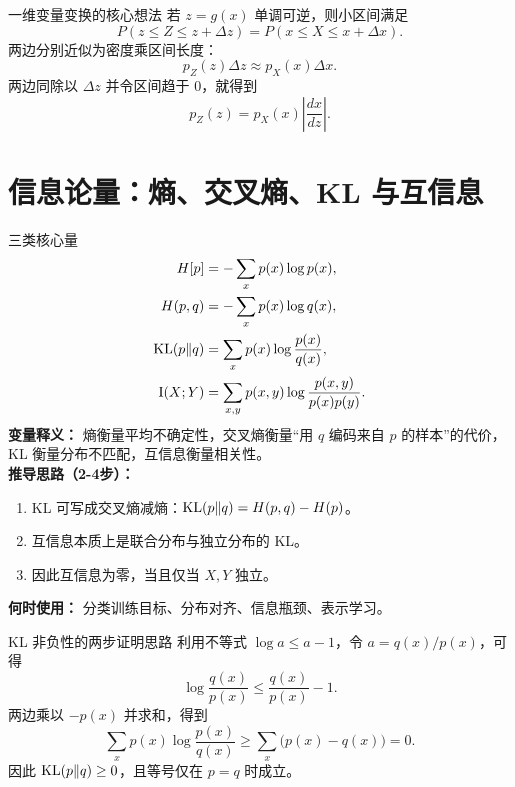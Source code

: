 \documentclass[11pt]{article}
\begin{document}
\begin{derivationbox}{一维变量变换的核心想法}
若 $z=g(x)$ 单调可逆，则小区间满足
\[
P(z\le Z\le z+\Delta z)=P(x\le X\le x+\Delta x).
\]
两边分别近似为密度乘区间长度：
\[
p_Z(z)\Delta z \approx p_X(x)\Delta x.
\]
两边同除以 $\Delta z$ 并令区间趋于 $0$，就得到
\[
p_Z(z)=p_X(x)\left|\frac{dx}{dz}\right|.
\]
\end{derivationbox}

\section{信息论量：熵、交叉熵、KL 与互信息}
\begin{formulabox}{三类核心量}
\begin{align}
H[p] &= -\sum_x p(x)\log p(x),\\
H(p,q) &= -\sum_x p(x)\log q(x),\\
\mathrm{KL}(p\|q) &= \sum_x p(x)\log\frac{p(x)}{q(x)},\\
\mathrm{I}(X;Y) &= \sum_{x,y}p(x,y)\log\frac{p(x,y)}{p(x)p(y)}.
\end{align}
\textbf{变量释义：} 熵衡量平均不确定性，交叉熵衡量“用 $q$ 编码来自 $p$ 的样本”的代价，KL 衡量分布不匹配，互信息衡量相关性。\\
\textbf{推导思路（2-4步）：}
\begin{enumerate}[leftmargin=1.6em]
  \item KL 可写成交叉熵减熵：$\mathrm{KL}(p\|q)=H(p,q)-H(p)$。
  \item 互信息本质上是联合分布与独立分布的 KL。
  \item 因此互信息为零，当且仅当 $X,Y$ 独立。
\end{enumerate}
\textbf{何时使用：} 分类训练目标、分布对齐、信息瓶颈、表示学习。
\end{formulabox}

\begin{derivationbox}{KL 非负性的两步证明思路}
利用不等式 $\log a \le a-1$，令 $a=q(x)/p(x)$，可得
\[
\log\frac{q(x)}{p(x)} \le \frac{q(x)}{p(x)}-1.
\]
两边乘以 $-p(x)$ 并求和，得到
\[
\sum_x p(x)\log\frac{p(x)}{q(x)} \ge \sum_x \bigl(p(x)-q(x)\bigr)=0.
\]
因此 $\mathrm{KL}(p\|q)\ge 0$，且等号仅在 $p=q$ 时成立。
\end{derivationbox}
\end{document}
